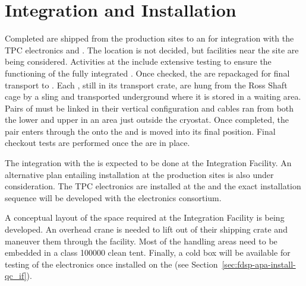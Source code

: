 \section{Integration and Installation}
\label{sec:fdsp-apa-install}

Completed  are shipped from the  production sites to an  for integration with the TPC  electronics and .  The  location is not decided, but facilities near the \surf site are being considered.   Activities at the   include extensive  testing to ensure the functioning of the fully integrated .  Once checked, the  are repackaged for final transport to \surf. Each , still in its transport crate, are hung from the Ross Shaft cage by a sling and transported underground where it is stored in a waiting area.  Pairs of  must be linked in their vertical configuration and cables ran from both the lower and upper  in an area just outside the cryostat.  Once completed, the pair enters through the  onto the  and is moved into its final position.  Final checkout tests are performed once the  are in place.

The integration with the  is expected to be done at the Integration Facility. %
An alternative plan entailing  installation at the  production sites is also under consideration. The TPC  electronics are installed  at the  and the exact installation sequence will be developed with the electronics consortium.

A conceptual layout of the space required at the Integration Facility is being developed. An overhead crane is needed to lift  out of their shipping crate and maneuver them through the facility.  Most of the handling areas need to be embedded in a class \num{100000} clean tent. Finally, a cold box will be available for  testing of the electronics once installed on the  (see Section~\ref{sec:fdsp-apa-install-qc_if}).  



